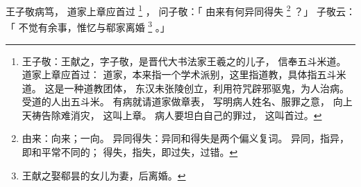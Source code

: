 
\switchcolumn*[\section{}]

王子敬病笃，
道家上章应首过%
\footnote{%
    王子敬：王献之，字子敬，是晋代大书法家王羲之的儿子，
            信奉五斗米道。
    道家上章应首过：
            道家，本来指一个学术派别，这里指道教，具体指五斗米道。
            这是一种道教团体，
            东汉未张陵创立，利用符咒辟邪驱鬼，为人治病。
            受道的人出五斗米。
            有病就请道家做章表，
            写明病人姓名、服罪之意，
            向上天祷告除难消灾，
            这叫上章。
            病人要坦白自己的罪过，
            这叫首过。
}%
，
问子敬：「
    由来有何异同得失%
    \footnote{%
        由来：向来；一向。
        异同得失：异同和得失是两个偏义复词。
                  异同，指异，即和平常不同的；
                  得失，指失，即过失，过错。
    }%
？」
子敬云：「
    不觉有余事，惟忆与郗家离婚%
    \footnote{%
        王献之娶郗昙的女儿为妻，后离婚。       
    }%
。」

\switchcolumn



